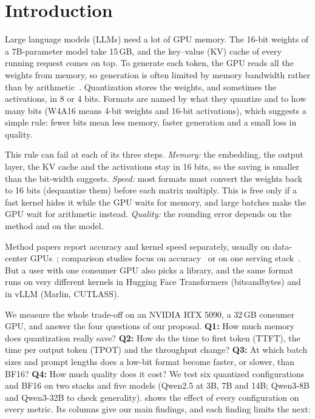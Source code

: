 \section{Introduction}
\label{sec:intro}

Large language models (LLMs) need a lot of GPU memory. The 16-bit weights of a 7B-parameter model
take 15\,GB, and the key--value (KV) cache of every running request comes on top. To generate each
token, the GPU reads all the weights from memory, so generation is often limited by memory bandwidth
rather than by arithmetic~\cite{pope2023efficiently,gholami2024memorywall}. Quantization stores the
weights, and sometimes the activations, in 8 or 4 bits. Formats are named by what they quantize and
to how many bits (W4A16 means 4-bit weights and 16-bit activations), which suggests a simple rule:
fewer bits mean less memory, faster generation and a small loss in quality.

This rule can fail at each of its three steps. \emph{Memory:} the embedding, the output layer, the
KV cache and the activations stay in 16 bits, so the saving is smaller than the bit-width suggests.
\emph{Speed:} most formats must convert the weights back to 16 bits (dequantize them) before each
matrix multiply. This is free only if a fast kernel hides it while the GPU waits for memory, and
large batches make the GPU wait for arithmetic instead. \emph{Quality:} the rounding error depends on
the method and on the model.

Method papers report accuracy and kernel speed separately, usually on data-center
GPUs~\cite{frantar2023gptq,lin2024awq,frantar2025marlin,lin2025qserve}; comparison studies focus on
accuracy~\cite{jin2024comprehensive,li2024evaluating} or on one serving stack~\cite{kurtic2024give}.
But a user with one consumer GPU also picks a library, and the same format runs on very different
kernels in Hugging Face Transformers (bitsandbytes) and in vLLM (Marlin, CUTLASS).

We measure the whole trade-off on an NVIDIA RTX 5090, a 32\,GB consumer GPU, and answer the four
questions of our proposal. \textbf{Q1:} How much memory does quantization really save?
\textbf{Q2:} How do the time to first token (TTFT), the time per output token (TPOT) and the
throughput change? \textbf{Q3:} At which batch sizes and prompt lengths does a low-bit format become
faster, or slower, than BF16? \textbf{Q4:} How much quality does it cost? We test six quantized
configurations and BF16 on two stacks and five models (Qwen2.5 at 3B, 7B and 14B; Qwen3-8B and
Qwen3-32B to check generality).  shows the effect of every configuration on every
metric. Its columns give our main findings, and each finding limits the next:

